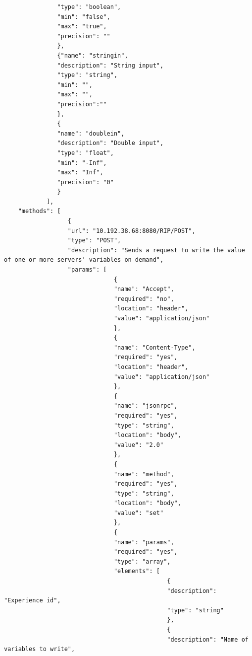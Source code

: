 \begin{lstlisting}
               "type": "boolean",
               "min": "false",
               "max": "true",
               "precision": ""
               },
               {"name": "stringin",
               "description": "String input",
               "type": "string",
               "min": "",
               "max": "",
               "precision":""
               },
               {
               "name": "doublein",
               "description": "Double input",
               "type": "float",
               "min": "-Inf",
               "max": "Inf",
               "precision": "0"
               }
            ],
    "methods": [
                  {
                  "url": "10.192.38.68:8080/RIP/POST",
                  "type": "POST",
                  "description": "Sends a request to write the value of one or more servers' variables on demand",
                  "params": [
                               {
                               "name": "Accept",
                               "required": "no",
                               "location": "header",
                               "value": "application/json"
                               },
                               {
                               "name": "Content-Type",
                               "required": "yes",
                               "location": "header",
                               "value": "application/json"
                               },
                               {
                               "name": "jsonrpc",
                               "required": "yes",
                               "type": "string",
                               "location": "body",
                               "value": "2.0"
                               },
                               {
                               "name": "method",
                               "required": "yes",
                               "type": "string",
                               "location": "body",
                               "value": "set"
                               },
                               {
                               "name": "params",
                               "required": "yes",
                               "type": "array",
                               "elements": [
                                              {
                                              "description": "Experience id",
                                              "type": "string"
                                              },
                                              {
                                              "description": "Name of variables to write",

\end{lstlisting}
